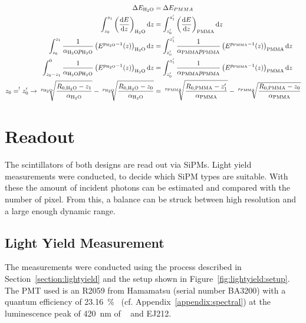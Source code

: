 \begin{align}
    \label{eq:detector:absorber:thickness}
    \Delta E_{\ce{H2O}} &= \Delta E_{PMMA} \\
    \int_{z_0}^{z_1} \left(\frac{\text{d}E}{\text{d}z}\right)_{\ce{H2O}}\text{d}z &= \int_{z_0'}^{z_1'} \left(\frac{\text{d}E}{\text{d}z}\right)_{\text{PMMA}}\text{d}z \\
    \int_{z_0}^{z_1} \frac{1}{\alpha_{\ce{H2O}} p_{\ce{H2O}}} \left(E^{p_{\ce{H2O}}-1}(z)\right)_{\ce{H2O}}\text{d}z &= \int_{z_0'}^{z_1'} \frac{1}{\alpha_{\text{PMMA}} p_{\text{PMMA}}} \left(E^{p_{\text{PMMA}}-1}(z)\right)_{\text{PMMA}}\text{d}z \\
    \int_{z_0-z_1}^{0} \frac{1}{\alpha_{\ce{H2O}} p_{\ce{H2O}}} \left(E^{p_{\ce{H2O}}-1}(z)\right)_{\ce{H2O}}\text{d}z &= \int_{z_0'}^{z_1'} \frac{1}{\alpha_{\text{PMMA}} p_{\text{PMMA}}} \left(E^{p_{\text{PMMA}}-1}(z)\right)_{\text{PMMA}}\text{d}z \\
    z_0=^{!}z_0'\rightarrow \sqrt[p_{\ce{H2O}}]{\frac{R_{0, \ce{H2O}}-z_1}{\alpha_{\ce{H2O}}}}-\sqrt[p_{\ce{H2O}}]{\frac{R_{0, \ce{H2O}}-z_0}{\alpha_{\ce{H2O}}}} &= \sqrt[p_{\text{PMMA}}]{\frac{R_{0, \text{PMMA}}-z_1'}{\alpha_{\text{PMMA}}}} - \sqrt[p_{\text{PMMA}}]{\frac{R_{0, \text{PMMA}}-z_0}{\alpha_{\text{PMMA}}}} \\
\end{align}


\section{Readout}\label{section:readout}
The scintillators of both designs are read out via SiPMs.
Light yield measurements were conducted, to decide which SiPM types are suitable.
With these the amount of incident photons can be estimated and compared with the number of pixel.
From this, a balance can be struck between high resolution and a large enough dynamic range.
 
\subsection{Light Yield Measurement}
The measurements were conducted using the process described in Section~\ref{section:lightyield} and the setup shown in Figure~\ref{fig:lightyield:setup}.
The PMT used is an R2059 from Hamamatsu (serial number BA3200) with a quantum efficiency of \SI{23.16}{\percent}~\cite{datasheet:hamamatsu_R2059} (cf. Appendix~\ref{appendix:spectral}) at the luminescence peak of \SI{420}{\nano\meter} of ~\cite{cms:tdr} and EJ212.

